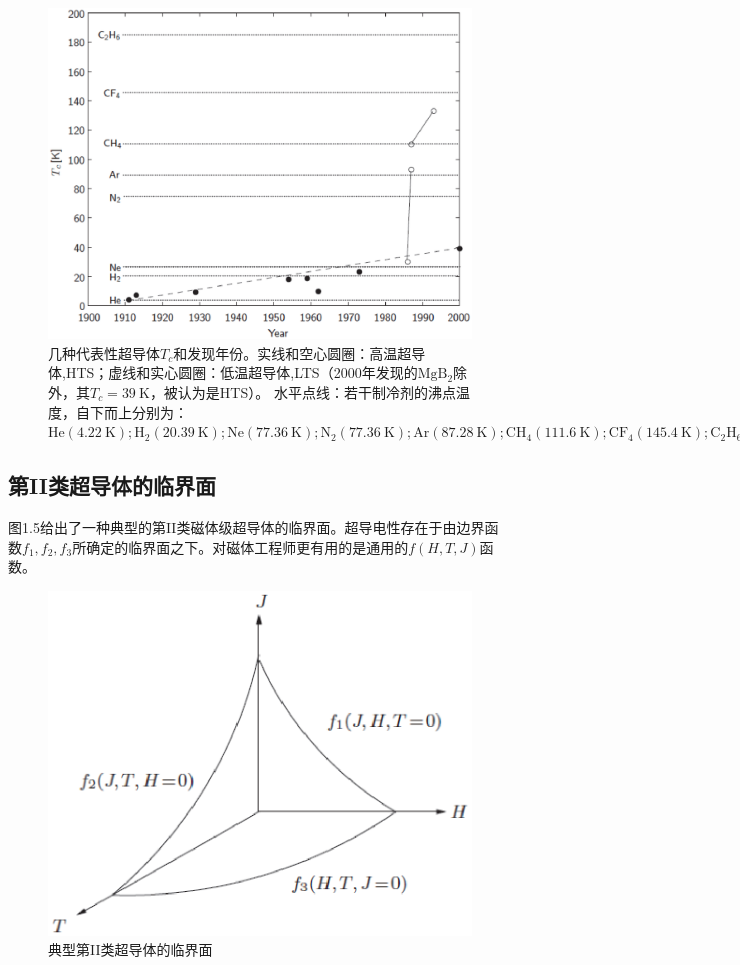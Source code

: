 \begin{figure}%
  \centering
 \includegraphics[scale=0.7]{chpt1/figs/fig1.4.eps}
  \caption{
几种代表性超导体$T_c$和发现年份。实线和空心圆圈：高温超导体,HTS；虚线和实心圆圈：低温超导体,LTS（2000年发现的$\mathrm{MgB_2}$除外，其$	T_c=39\ \mathrm{K}$，被认为是HTS）。
水平点线：若干制冷剂的沸点温度，自下而上分别为：$\mathrm{
He(4.22\ K);H_2(20.39\ K);Ne(77.36\ K);N_2(77.36\ K);Ar(87.28\ K);
CH_4(111.6\ K);CF_4(145.4\ K);C_2H_6(184.6\ K)}。$
}
\end{figure}


\subsection{第II类超导体的临界面}
图1.5给出了一种典型的第II类磁体级超导体的临界面。超导电性存在于由边界函数$f_1,f_2,f_3$所确定的临界面之下。对磁体工程师更有用的是通用的$f(H,T,J)$函数。
\begin{figure}
  \centering
 \includegraphics[scale=0.6]{chpt1/figs/fig1.5.eps}
  \caption{
典型第II类超导体的临界面
}\label{ciriticalsurface}
\end{figure}

